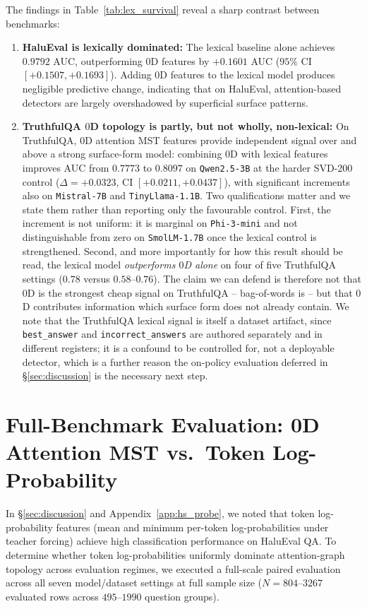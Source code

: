 \documentclass{article}
\begin{document}
The findings in Table~\ref{tab:lex_survival} reveal a sharp contrast between benchmarks:
\begin{enumerate}
    \item \textbf{HaluEval is lexically dominated:} The lexical baseline alone achieves $0.9792$ AUC, outperforming $0$D features by $+0.1601$ AUC ($95\%$ CI $[+0.1507, +0.1693]$). Adding $0$D features to the lexical model produces negligible predictive change, indicating that on HaluEval, attention-based detectors are largely overshadowed by superficial surface patterns.
    \item \textbf{TruthfulQA $0$D topology is partly, but not wholly, non-lexical:} On TruthfulQA, $0$D attention MST features provide independent signal over and above a strong surface-form model: combining $0$D with lexical features improves AUC from $0.7773$ to $0.8097$ on \texttt{Qwen2.5-3B} at the harder SVD-200 control ($\Delta = +0.0323$, CI $[+0.0211,+0.0437]$), with significant increments also on \texttt{Mistral-7B} and \texttt{TinyLlama-1.1B}. Two qualifications matter and we state them rather than reporting only the favourable control. First, the increment is not uniform: it is marginal on \texttt{Phi-3-mini} and not distinguishable from zero on \texttt{SmolLM-1.7B} once the lexical control is strengthened. Second, and more importantly for how this result should be read, the lexical model \emph{outperforms $0$D alone} on four of five TruthfulQA settings ($0.78$ versus $0.58$--$0.76$). The claim we can defend is therefore not that $0$D is the strongest cheap signal on TruthfulQA -- bag-of-words is -- but that $0$D contributes information which surface form does not already contain. We note that the TruthfulQA lexical signal is itself a dataset artifact, since \texttt{best\_answer} and \texttt{incorrect\_answers} are authored separately and in different registers; it is a confound to be controlled for, not a deployable detector, which is a further reason the on-policy evaluation deferred in \S\ref{sec:discussion} is the necessary next step.
\end{enumerate}


\section{Full-Benchmark Evaluation: 0D Attention MST vs.\ Token Log-Probability}
\label{app:mst_vs_logprob}

In \S\ref{sec:discussion} and Appendix~\ref{app:hs_probe}, we noted that token log-probability features (mean and minimum per-token log-probabilities under teacher forcing) achieve high classification performance on HaluEval QA. To determine whether token log-probabilities uniformly dominate attention-graph topology across evaluation regimes, we executed a full-scale paired evaluation across all seven model/dataset settings at full sample size ($N=804$--$3267$ evaluated rows across $495$--$1990$ question groups). 
\end{document}
